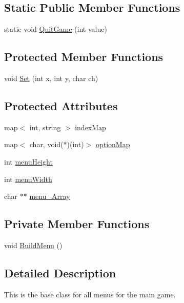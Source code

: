 \subsection*{Static Public Member Functions}
\begin{DoxyCompactItemize}
\item 
static void \hyperlink{classMenu_a8acabbf165ce6e169f67389ee54c988d}{Quit\-Game} (int value)
\end{DoxyCompactItemize}
\subsection*{Protected Member Functions}
\begin{DoxyCompactItemize}
\item 
void \hyperlink{classMenu_aa13913062e78fbd036ca698e0c0c5038}{Set} (int x, int y, char ch)
\end{DoxyCompactItemize}
\subsection*{Protected Attributes}
\begin{DoxyCompactItemize}
\item 
map$<$ int, string $>$ \hyperlink{classMenu_a18566c84b43074d03f0ad3cacd748aae}{index\-Map}
\item 
map$<$ char, void($\ast$)(int)$>$ \hyperlink{classMenu_a1482795732b18033b8cc3214b4c87176}{option\-Map}
\item 
int \hyperlink{classMenu_ad9364e391e91acd266444a2604cb838e}{menu\-Height}
\item 
int \hyperlink{classMenu_a5c90eda61cd9071dcafda04569dfdd67}{menu\-Width}
\item 
char $\ast$$\ast$ \hyperlink{classMenu_a6fdd29d716c7fb985f038ddde93794a0}{menu\-\_\-\-Array}
\end{DoxyCompactItemize}
\subsection*{Private Member Functions}
\begin{DoxyCompactItemize}
\item 
void \hyperlink{classMenu_aaae232bbb2e874c2abb18b470259ab33}{Build\-Menu} ()
\end{DoxyCompactItemize}


\subsection{Detailed Description}
This is the base class for all menus for the main game. 

